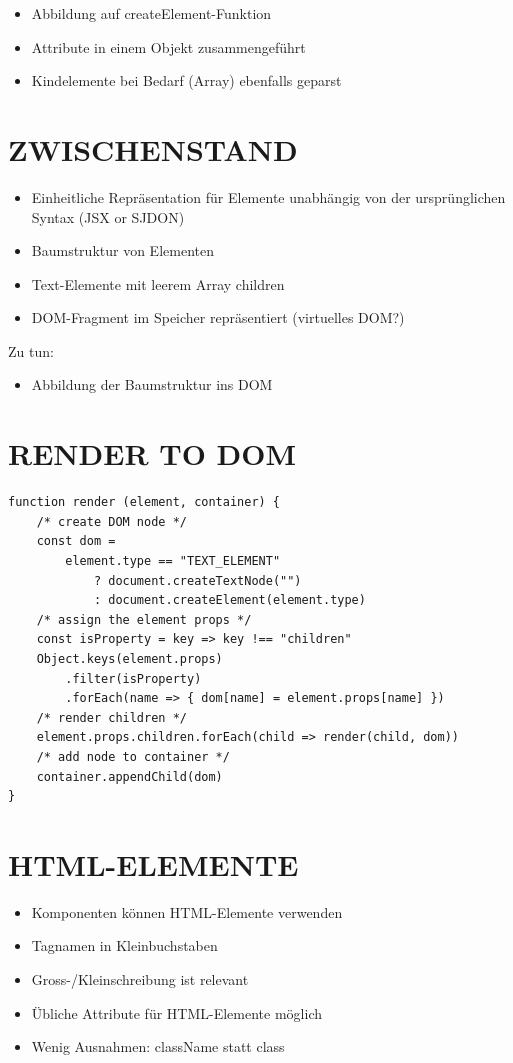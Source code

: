 \documentclass[10pt]{article}
\begin{document}
\begin{itemize}
  \item Abbildung auf createElement-Funktion
  \item Attribute in einem Objekt zusammengeführt
  \item Kindelemente bei Bedarf (Array) ebenfalls geparst
\end{itemize}

\section*{ZWISCHENSTAND}
\begin{itemize}
  \item Einheitliche Repräsentation für Elemente unabhängig von der ursprünglichen Syntax (JSX or SJDON)
  \item Baumstruktur von Elementen
  \item Text-Elemente mit leerem Array children
  \item DOM-Fragment im Speicher repräsentiert (virtuelles DOM?)
\end{itemize}

Zu tun:

\begin{itemize}
  \item Abbildung der Baumstruktur ins DOM
\end{itemize}

\section*{RENDER TO DOM}
\begin{verbatim}
function render (element, container) {
    /* create DOM node */
    const dom =
        element.type == "TEXT_ELEMENT"
            ? document.createTextNode("")
            : document.createElement(element.type)
    /* assign the element props */
    const isProperty = key => key !== "children"
    Object.keys(element.props)
        .filter(isProperty)
        .forEach(name => { dom[name] = element.props[name] })
    /* render children */
    element.props.children.forEach(child => render(child, dom))
    /* add node to container */
    container.appendChild(dom)
}
\end{verbatim}

\section*{HTML-ELEMENTE}
\begin{itemize}
  \item Komponenten können HTML-Elemente verwenden
  \item Tagnamen in Kleinbuchstaben
  \item Gross-/Kleinschreibung ist relevant
  \item Übliche Attribute für HTML-Elemente möglich
  \item Wenig Ausnahmen: className statt class
\end{itemize}
\end{document}
